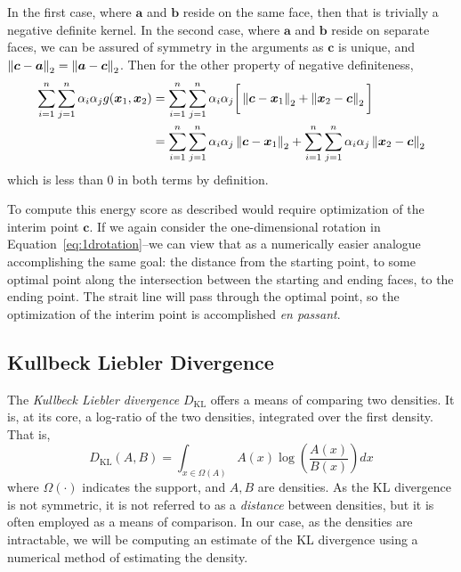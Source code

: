 In the first case, where $\bm{a}$ and $\bm{b}$ reside on the same face, then that is trivially a
  negative definite kernel.  In the second case, where $\bm{a}$ and $\bm{b}$ reside on separate
  faces, we can be assured of symmetry in the arguments as $\bm{c}$ is unique, and $\left\lVert \bm{c} - \bm{a} \right\rVert_{2} = \left\lVert \bm{a} - \bm{c} \right\rVert_{2}$.  Then for the other property of negative definiteness,
  \begin{equation*}
    \begin{aligned}
      \sum_{i = 1}^n\sum_{j = 1}^n \alpha_i\alpha_j g(\bm{x}_1,\bm{x}_2) &= \sum_{i = 1}^n\sum_{j = 1}^n \alpha_i\alpha_j \bigg[\left\lVert \bm{c} - \bm{x}_1 \right\rVert_{2} + \left\lVert \bm{x}_2 - \bm{c} \right\rVert_{2}\bigg]\\
      &= \sum_{i = 1}^n\sum_{j = 1}^n \alpha_i\alpha_j\left\lVert \bm{c} - \bm{x}_1 \right\rVert_{2} + \sum_{i = 1}^n\sum_{j = 1}^n \alpha_i\alpha_j\left\lVert \bm{x}_2 - \bm{c} \right\rVert_{2}
    \end{aligned}
  \end{equation*}
  which is less than $0$ in both terms by definition.
 
To compute this energy score as described would require optimization of the interim point $\bm{c}$.
  If we again consider the one-dimensional rotation in Equation~\ref{eq:1drotation}--we
  can view that as a numerically easier analogue accomplishing the same goal: the distance from 
  the starting point, to some optimal point along the intersection between the starting and 
  ending faces, to the ending point.  The strait line will pass through the optimal point, so
  the optimization of the interim point is accomplished \emph{en passant}.

\subsection{Kullbeck Liebler Divergence}
The \emph{Kullbeck Liebler divergence} $D_{\text{KL}}$ offers a means of comparing two densities.
  It is, at its core, a log-ratio of the two densities, integrated over the first density.  That is,
  \begin{equation}
    \label{eqn:kld}
    D_{\text{KL}}(A,B) = \int_{x\in \Omega(A)}A(x)\log\left(\frac{A(x)}{B(x)}\right)dx
  \end{equation}
  where $\Omega(\cdot)$ indicates the support, and $A,B$ are densities.  As the KL divergence is not
  symmetric, it is not referred to as a \emph{distance} between densities, but it is often employed
  as a means of comparison.  In our case, as the densities are intractable, we will be computing an
  estimate of the KL divergence using a numerical method of estimating the density.

